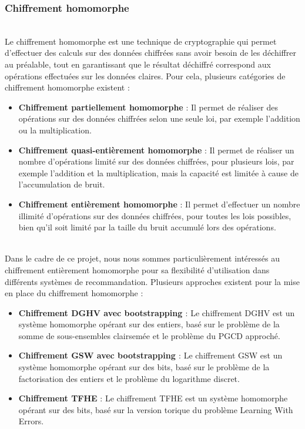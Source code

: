 \documentclass{article}
\begin{document}
\subsubsection{Chiffrement homomorphe}
$ $\\
Le chiffrement homomorphe est une technique de cryptographie qui permet d'effectuer des calculs sur des données chiffrées sans avoir besoin de les déchiffrer au préalable, tout en garantissant que le résultat déchiffré correspond aux opérations effectuées sur les données claires. 
Pour cela, plusieurs catégories de chiffrement homomorphe existent :  
\begin{itemize}
    \item \textbf{Chiffrement partiellement homomorphe} : Il permet de réaliser des opérations sur des données chiffrées selon une seule loi, par exemple l'addition ou la multiplication.  
    \item \textbf{Chiffrement quasi-entièrement homomorphe} : Il permet de réaliser un nombre d'opérations limité sur des données chiffrées, pour plusieurs lois, par exemple l'addition et la multiplication, mais la capacité est limitée à cause de l'accumulation de bruit.  
    \item \textbf{Chiffrement entièrement homomorphe} : Il permet d'effectuer un nombre illimité d'opérations sur des données chiffrées, pour toutes les lois possibles, bien qu'il soit limité par la taille du bruit accumulé lors des opérations.  
\end{itemize}
$ $\\
Dans le cadre de ce projet, nous nous sommes particulièrement intéressés au chiffrement entièrement homomorphe pour sa flexibilité d'utilisation dans différents systèmes de recommandation.  
Plusieurs approches existent pour la mise en place du chiffrement homomorphe :  
\begin{itemize}
    \item \textbf{Chiffrement DGHV avec bootstrapping \cite{boots}} : Le chiffrement DGHV \cite{dghv} est un système homomorphe opérant sur des entiers, basé sur le problème de la somme de sous-ensembles clairsemée et le problème du PGCD approché.  
    \item \textbf{Chiffrement GSW avec bootstrapping \cite{boots}} : Le chiffrement GSW \cite{gsw} est un système homomorphe opérant sur des bits, basé sur le problème de la factorisation des entiers et le problème du logarithme discret.  
    \item \textbf{Chiffrement TFHE} : Le chiffrement TFHE \cite{tfhe} est un système homomorphe opérant sur des bits, basé sur la version torique du problème Learning With Errors.  
\end{itemize}
\end{document}
